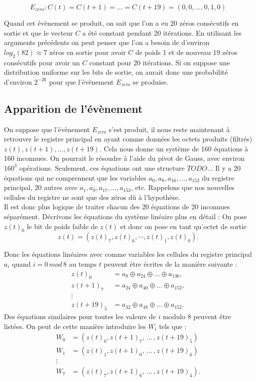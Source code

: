 \documentclass[11pt]{report}
\begin{document}
$$
E_{zero} : C(t) = C(t+1) = ... = C(t+19) = (0,0,...,0,1,0)
$$

Quand cet évènement se produit, on sait que l'on a eu 20 zéros consécutifs en sortie et que le vecteur $C$ a été constant pendant 20 itérations. En utilisant les arguments précédents on peut penser que l'on a besoin de d'environ $log_2(82) \approx 7$ zéros en sortie pour avoir $C$ de poids 1 et de nouveau 19 zéros consécutifs pour avoir un $C$ constant pour 20 itérations. Si on suppose une distribution uniforme sur les bits de sortie, on aurait donc une probabilité d'environ $2^{-26}$ pour que l'évènement $E_{zero}$ se produise. 

\subsection{Apparition de l'évènement}

On suppose que l'évènement $E_{zero}$ s'est produit, il nous reste maintenant à retrouver le registre principal en ayant comme données les octets produits (filtrés) $z(t),z(t+1),...,z(t+19)$. Cela nous donne un système de 160 équations à 160 inconnues. On pourrait le résoudre à l'aide du pivot de Gauss, avec environ $160^3$ opérations. 
Seulement, ces équations ont une structure $TODO$...
Il y a 20 équations qui ne comprennent que les variables $a_0,a_8,a_{16},...,a_{152}$ du registre principal, 20 autres avec $a_1,a_9,a_{17},...,a_{153}$, etc. Rappelons que nos nouvelles cellules du registre ne sont que des zéros dû à l'hypothèse. 
\\
Il est donc plus logique de traiter chacun des 20 équations de 20 inconnues séparément. Décrivons les équations du système linéaire plus en détail : 
On pose $z(t)_0$ le bit de poids faible de $z(t)$ et donc on pose en tant qu'octet de sortie 
$$
z(t) = (z(t)_7,z(t)_6,\cdots ,z(t)_1,z(t)_0).
$$
 
Donc les équations linéaires avec comme variables les cellules du registre principal $a_i$ quand $i = 0 \, mod \, 8$ au temps $t$ peuvent être écrites de la manière suivante :
\begin{align*}
z(t)_0 &= a_8 \oplus a_{24} \oplus ... \oplus a_{136},\\
z(t+1)_7 &= a_{24} \oplus a_{40} \oplus ... \oplus a_{152},\\
\vdots\\
z(t+19)_5 &= a_{32} \oplus a_{48} \oplus ... \oplus a_{152}.
\end{align*}
Des équations similaires pour toutes les valeurs de $i$ modulo 8 peuvent être listées. On peut de cette manière introduire les $W_i$ tels que : 
\begin{align*}
W_0 &= (z(t)_0,z(t+1)_7, \, ... \, , z(t+19)_5)\\
W_1 &= (z(t)_1,z(t+1)_0, \, ... \, , z(t+19)_6)\\
\vdots\\
W_7 &= (z(t)_7,z(t+1)_6, \, ... \, , z(t+19)_4).
\end{align*}
\end{document}
